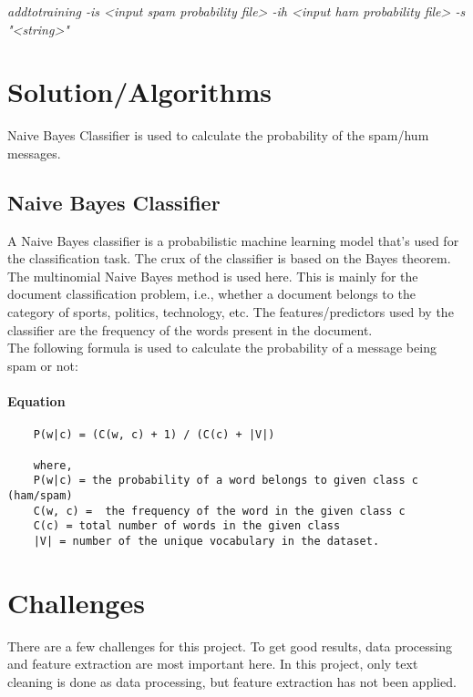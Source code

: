 \documentclass[twoside,10pt]{article}
\begin{document}
\textit{addtotraining -is \textless{}input spam probability file\textgreater{} -ih \textless{}input ham probability file\textgreater{} -s "\textless{}string\textgreater{}"}

\section*{Solution/Algorithms}\label{solutionalgorithms}

Naive Bayes Classifier is used to calculate the probability of the
spam/hum messages.

\subsection*{Naive Bayes Classifier}\label{naive-bayes-classifier}

A Naive Bayes classifier is a probabilistic machine learning model that’s used for the classification task. The crux of the classifier is based on the Bayes theorem.\\

The multinomial Naive Bayes method is used here. This is mainly for the document classification problem, i.e., whether a document belongs to the category of sports, politics, technology, etc. The features/predictors used by the classifier are the frequency of the words present in the document.\\

The following formula is used to calculate the probability of a message being spam or not:
\paragraph{Equation}\label{equation}

\begin{verbatim}
    P(w|c) = (C(w, c) + 1) / (C(c) + |V|)

    where,
    P(w|c) = the probability of a word belongs to given class c (ham/spam)
    C(w, c) =  the frequency of the word in the given class c
    C(c) = total number of words in the given class
    |V| = number of the unique vocabulary in the dataset.
\end{verbatim}

\section*{Challenges}\label{challenges}

There are a few challenges for this project. To get good results, data
processing and feature extraction are most important here. In this
project, only text cleaning is done as data processing, but feature
extraction has not been applied.\\
\end{document}
